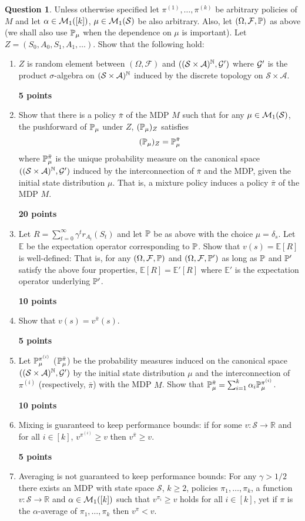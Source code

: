 \documentclass{article}
\newcommand{\R}{\mathbb{R}}
\DeclareMathOperator*{\1}{\mathbbm{1}}
\newcommand{\E}{\mathbb E}
\newcommand{\cF}{\mathcal{F}}
\newcommand{\0}{\mathbf{0}}
\newcounter{DocPoints} %
\newcounter{QuestionPoints} %
\newcommand{\points}[1]{%
	\par\mbox{}\par\noindent\hfill {\bf #1 points}%
	\addtocounter{DocPoints}{#1}
	\addtocounter{QuestionPoints}{#1}
}
\theoremstyle{definition}
\newtheorem{question}{Question}
\theoremstyle{remark}
\theoremstyle{theorem}
\newcommand{\cS}{\mathcal{S}}
\newcommand{\cA}{\mathcal{A}}
\begin{document}
\begin{question}
Unless otherwise specified let
 $\pi^{(1)},\dots,\pi^{(k)}$ be arbitrary policies of $M$ and let $\alpha\in \mathcal{M}_1([k])$, $\mu \in \cM_1(\cS)$ be also arbitrary.
 Also, let $(\Omega,\cF,\PP)$ as above (we shall also use $\mathbb{P}_\mu$ when the dependence on $\mu$ is important).
 Let
 $Z = (S_0,A_0,S_1,A_1,\dots)$.
Show that the following hold:
\begin{enumerate}
\item $Z$ is random element between $(\Omega,\cF)$ and $((\cS\times \cA)^{\N},\cG')$ where $\mathcal{G}'$ is the product $\sigma$-algebra on $(\cS\times \cA)^{\N}$
induced by the discrete topology on $\cS \times \cA$.
\points{5}
\item
\label{q1:a3:1}
Show that there is a policy $\bar \pi$ of the MDP $M$ such that for any $\mu \in \cM_1(\cS)$,
the pushforward of $\mathbb{P}_\mu$ under $Z$, $(\mathbb{P}_\mu)_Z$ satisfies
\[
(\mathbb{P}_\mu)_Z =\mathbb{P}_\mu^{\bar \pi}
\]
where $\mathbb{P}_\mu^{\bar \pi}$ is the unique probability measure on
the canonical space $((\cS\times \cA)^{\N},\cG')$
induced
by the interconnection of  $\bar \pi$ and the MDP, given the initial state distribution $\mu$.
That is, a mixture policy induces a policy $\bar \pi$ of the MDP $M$.
\points{20}
\item
Let $R=\sum_{t=0}^\infty \gamma^t r_{A_t}(S_t)$ and
let $\mathbb{P}$ be as above with the choice $\mu= \delta_s$. Let $\E$ be the expectation operator
corresponding to $\mathbb{P}$.
Show that $v(s)=\E[R]$ is well-defined:
That is,
for any $(\Omega,\cF,\PP)$ and $(\Omega,\cF,\PP')$ as long as $\mathbb{P}$ and $\mathbb{P}'$ satisfy the above four properties, $\E[R]=\E'[R]$ where $\E'$ is the expectation operator underlying $\mathbb{P}'$.
\points{10}
\item
Show that $v(s) = v^{\bar \pi}(s)$.
\points{5}
\item Let $\mathbb{P}_\mu^{\pi^{(i)}}$ ($\mathbb{P}_{\mu}^{\bar \pi}$) be the
probability measures induced on the canonical space
$((\cS \times \cA)^{\N},\cG')$ by the initial state distribution $\mu$ and the interconnection of
$\pi^{(i)}$ (respectively, $\bar \pi$) with the MDP $M$. Show that
$\mathbb{P}_{\mu}^{\bar \pi} = \sum_{i=1}^k \alpha_i \mathbb{P}_{\mu}^{\pi^{(i)}}$.
\points{10}
\item Mixing is guaranteed to keep performance bounds:
if for some
$v:\cS \to \R$ and for all $i\in [k]$,
$v^{\pi^{(i)}}\ge v$ then $v^{\bar \pi}\ge v$.
\points{5}
\item Averaging is not guaranteed to keep performance bounds:
For any $\gamma>1/2$
there exists an MDP with state space $\cS$, $k\ge 2$, policies $\pi_1,\dots,\pi_k$, a function $v:\cS \to \R$ and $\alpha\in \mathcal{M}_1([k])$ such that $v^{\pi_i}\ge v$ holds for all $i\in [k]$, yet if $\pi$ is the $\alpha$-average of $\pi_1,\dots,\pi_k$ then $v^\pi<v$.

\end{enumerate}
\end{question}
\end{document}
